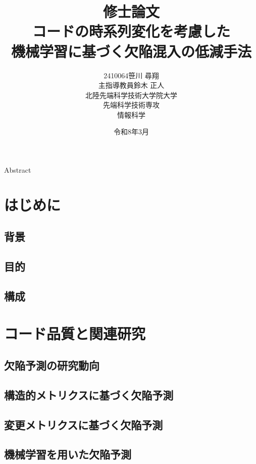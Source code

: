 \documentclass[12pt,a4j]{ltjsreport}
\title{ \large 修士論文\\
\vspace{10mm}
 \LARGE コードの時系列変化を考慮した\\機械学習に基づく欠陥混入の低減手法}
\author{%
  2410064\quad 笹川 尋翔\\
  \vspace{40mm}
  主指導教員\quad 鈴木 正人\\
  \vspace{0mm}
  北陸先端科学技術大学院大学\\
  先端科学技術専攻\\
  情報科学
}
\date{令和8年3月}
\begin{document}
\maketitle

\centerline{Abstract}

\clearpage

\tableofcontents
\cleardoublepage
{}

\listoffigures\thispagestyle{empty}
\listoftables\thispagestyle{empty}
\setcounter{page}{0}

\chapter{はじめに}
\section{背景}

\section{目的}

\section{構成}

\clearpage

\chapter{コード品質と関連研究}
\section{欠陥予測の研究動向}

\section{構造的メトリクスに基づく欠陥予測}

\section{変更メトリクスに基づく欠陥予測}

\section{機械学習を用いた欠陥予測}

\end{document}
